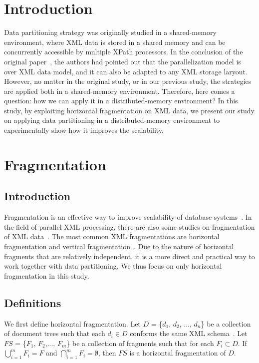 
\section{Introduction}

Data partitioning strategy was originally studied in a shared-memory
environment, where XML data is stored in a shared memory and can be concurrently
accessible by multiple XPath processors. In the conclusion of the original
paper~\cite{BoLS09},  the authors had pointed out that the parallelization model is over XML
data model, and it can also be adapted to any XML storage laryout. However, no matter in
the original study, or in our previous study, the strategies are applied both
in a shared-memory environment. Therefore, here comes a question:  how we can
apply it in a distributed-memory environment? In this study, by exploiting
horizontal fragmentation on XML data, we present our study on applying data
partitioning in a distributed-memory environment to experimentally show how it
improves the scalability.

\section{Fragmentation}

\subsection{Introduction}
Fragmentation is an effective way to improve scalability of database
systems~\cite{navathe1995mixed, hauglid2010dyfram, khan2010new}.  In the field
of parallel XML processing, there are also some studies on  fragmentation of XML
data~\cite{kling11:dist_xml, KlOD10}.  The most common XML fragmentations are
horizontal fragmentation and vertical fragmentation~\cite{kling11:dist_xml}. Due
to the nature of horizontal fragments that are  relatively independent, it is a
more direct and practical way to work together with data partitioning. We thus
focus on only horizontal fragmentation in this study.

\subsection{Definitions}
We first define horizontal fragmentation.  Let $D$ = \{$d_1$, $d_2$, ...,
$d_n$\} be a collection of document trees such that each $d_i \in D$ conforms
the same XML schema~\cite{xmlschema}.  Let $\mathit{FS}$ = \{$F_1$, $F_2$,...,
$F_m$\}  be a collection of fragments such that for each $F_i \subset D$. If
$\bigcup\limits_{i=1}^{m} F_{i} = F$ and $\bigcap\limits_{i=1}^{m} F_{i} =
\emptyset$, then $\mathit{FS}$ is a horizontal fragmentation of $D$.

